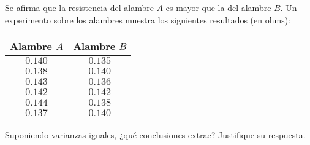 \begin{enunciado}
 Se afirma que la resistencia del alambre $A$ es mayor que la del alambre $B$. Un experimento sobre los alambres muestra los siguientes resultados (en ohms):
 \begin{center}
  \begin{tabular}{cc}
   \textbf{Alambre} $\mathbf{\mathit{A}}$ & \textbf{Alambre} $\mathbf{\mathit{B}}$ \\
   \hline 
   $0.140$ & $0.135$ \\
   $0.138$ & $0.140$ \\
   $0.143$ & $0.136$ \\
   $0.142$ & $0.142$ \\
   $0.144$ & $0.138$ \\
   $0.137$ & $0.140$
  \end{tabular}
 \end{center}
 Suponiendo varianzas iguales, ¿qu\'e conclusiones extrae? Justifique su respuesta.
\end{enunciado}

